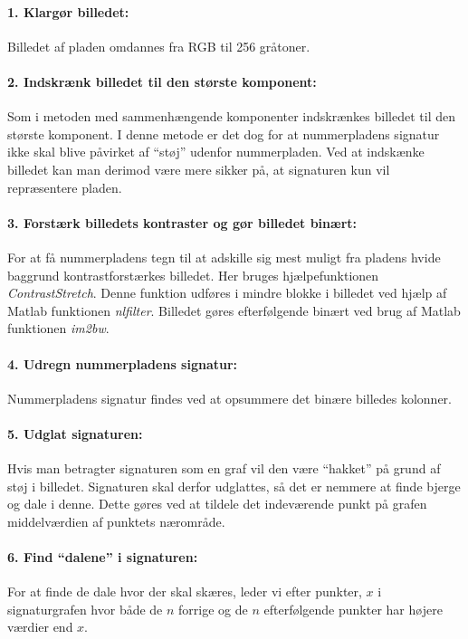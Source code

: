 \paragraph{1. Klargør billedet:} Billedet af pladen omdannes fra RGB til 256 gråtoner.

\paragraph{2. Indskrænk billedet til den største komponent:} Som i metoden med sammenhængende komponenter indskrænkes billedet til den største komponent. I denne metode er det dog for at nummerpladens signatur ikke skal blive påvirket af ``støj'' udenfor nummerpladen. Ved at indskænke billedet kan man derimod være mere sikker på, at signaturen kun vil repræsentere pladen.

\paragraph{3. Forstærk billedets kontraster og gør billedet binært:} For at få nummerpladens tegn til at adskille sig mest muligt fra pladens hvide baggrund kontrastforstærkes billedet. Her bruges hjælpefunktionen \textit{ContrastStretch}. Denne funktion udføres i mindre blokke i billedet ved hjælp af Matlab funktionen \textit{nlfilter}. Billedet gøres efterfølgende binært ved brug af Matlab funktionen \textit{im2bw}.

\paragraph{4. Udregn nummerpladens signatur:} Nummerpladens signatur findes ved at opsummere det binære billedes kolonner.

\paragraph{5. Udglat signaturen:} Hvis man betragter signaturen som en graf vil den være ``hakket'' på grund af støj i billedet. Signaturen skal derfor udglattes, så det er nemmere at finde bjerge og dale i denne. Dette gøres ved at tildele det indeværende punkt på grafen middelværdien af punktets nærområde.

\paragraph{6. Find ``dalene'' i signaturen:}
For at finde de dale hvor der skal skæres, leder vi efter punkter, $x$ i signaturgrafen hvor både de $n$ forrige og de $n$ efterfølgende punkter har højere værdier end $x$.

